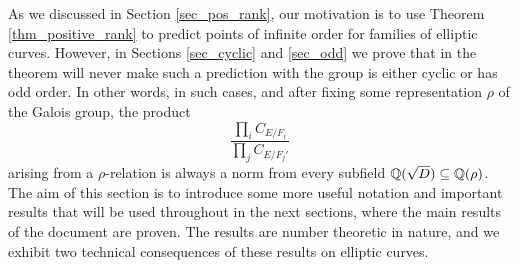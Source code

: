 As we discussed in Section \ref{sec_pos_rank}, our motivation is to use Theorem \ref{thm_positive_rank} to predict points of infinite order for families of elliptic curves. However, in Sections \ref{sec_cyclic} and \ref{sec_odd} we prove that in the theorem will never make such a prediction with the group is either cyclic or has odd order. In other words, in such cases, and after fixing some representation $\rho$ of the Galois group, the product
\begin{equation}\label{eqn_localprod}
    \frac{\prod_i C_{E/F_i}}{\prod_j C_{E/F_j'}}
\end{equation}
arising from a $\rho$-relation is always a norm from every subfield $\mathbb{Q}(\sqrt{D})\subseteq\mathbb{Q}(\rho)$. The aim of this section is to introduce some more useful notation and important results that will be used throughout in the next sections, where the main results of the document are proven. The results are number theoretic in nature, and we exhibit two technical consequences of these results on elliptic curves.





